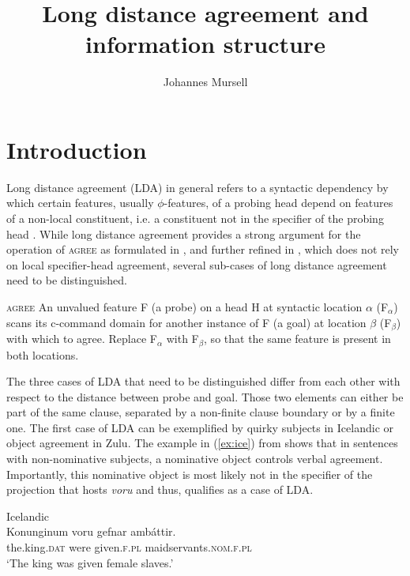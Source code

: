 \documentclass[output=paper
,modfonts
,nonflat]{langsci/langscibook}
\title{Long distance agreement and information structure}
\author{Johannes Mursell\affiliation{Goethe-Universität Frankfurt am Main}}
\begin{document}
\maketitle

\section{Introduction} 
Long distance agreement (LDA) in general refers to a syntactic dependency by which certain features, usually $ \phi $-features, of a probing head depend on features of a non-local constituent, i.e. a constituent not in the specifier of the probing head \citep{Bhatt_Keine2016}. While long distance agreement provides a strong argument for the operation of \textsc{agree} as formulated in \citet{Chomsky2000,Chomsky2001}, and further refined in \citet{Pesetsky_Torrego2007}, which does not rely on local specifier-head agreement, several sub-cases of long distance agreement need to be distinguished.
\begin{exe} 
\ex \label{def:agr_pt} \textsc{agree} \citep[][268]{Pesetsky_Torrego2007}
	\xlist
	\ex An unvalued feature F (a probe) on a head H at syntactic location $\alpha$ (F$_{\alpha}$) scans its c-command domain for another instance of F (a goal) at location $\beta$ (F$_{\beta}$) with which to agree. 
	\ex Replace F$_{\alpha}$ with F$_{\beta}$, so that the same feature is present in both locations.
	\endxlist
\end{exe}
The three cases of LDA that need to be distinguished differ from each other with respect to the distance between probe and goal. Those two elements can either be part of the same clause, separated by a non-finite clause boundary or by a finite one. The first case of LDA can be exemplified by quirky subjects in Icelandic or object agreement in Zulu. The example in (\ref{ex:ice}) from \citet{Zaenen_et_al1985} shows that in sentences with non-nominative subjects, a nominative object controls verbal agreement. Importantly, this nominative object is most likely not in the specifier of the projection that hosts \textit{voru} and thus, qualifies as a case of LDA.
\begin{exe} 
\ex Icelandic \citep[][460]{Zaenen_et_al1985}\label{ex:ice}\\ 
	\gll Konunginum voru gefnar amb\'{a}ttir.\\
	 the.king.\textsc{dat} were given.\textsc{f.pl} maidservants.\textsc{nom.f.pl}\\
	\glt `The king was given female slaves.'
\end{exe}
\end{document}
